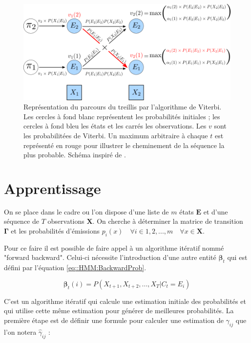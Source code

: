 \documentclass[12pt, french]{report}
\begin{document}
\begin{figure}[ht]
\begin{center}
\includegraphics[width= 0.8 \textwidth]{Images/Models/HMM/Viterbi.png}
\caption{Représentation du parcours du treillis par l'algorithme de Viterbi. Les cercles à fond blanc représentent les probabilités initiales ; les cercles à fond bleu les états et les carrés les observations. Les $v$ sont les probabilitées de Viterbi. Un maximum arbitraire à chaque $t$ est représenté en rouge pour illustrer le cheminement de la séquence la plus probable. Schéma inspiré de \cite{jurafsky_speech_2017}.}
\label{fig::HMM:ViterbiAlgo}
\end{center}
\end{figure}

\section{Apprentissage}
\label{subsubsec:Models_HMM_Apprentissage}
On se place dans le cadre ou l'on dispose d'une liste de $m$ états $\bm{E}$ et d'une séquence de $T$ observations $\bm{X}$. On cherche à déterminer la matrice de transition $\bm{\Gamma}$ et les probabilités d'émissions $p_i(x) \quad \forall i\in 1,2,...,m \quad \forall x \in \bm{X}$.

Pour ce faire il est possible de faire appel à un algorithme itératif nommé "forward backward". Celui-ci nécessite l'introduction d'une autre entité $\bm{\beta}_t$ qui est défini par l'équation \eqref{eq::HMM:BackwardProb}.

\begin{equation}
\bm{\beta}_t(i) = P(X_{t+1},X_{t+2},...,X_{T}|C_t=E_i)
\label{eq::HMM:BackwardProb}
\end{equation}

C'est un algorithme itératif qui calcule une estimation initiale des probabilités et qui utilise cette même estimation pour générer de meilleures probabilités. La première étape est de définir une formule pour calculer une estimation de $\gamma_{ij}$ que l'on notera $\hat{\gamma}_{ij}$ :
\end{document}
